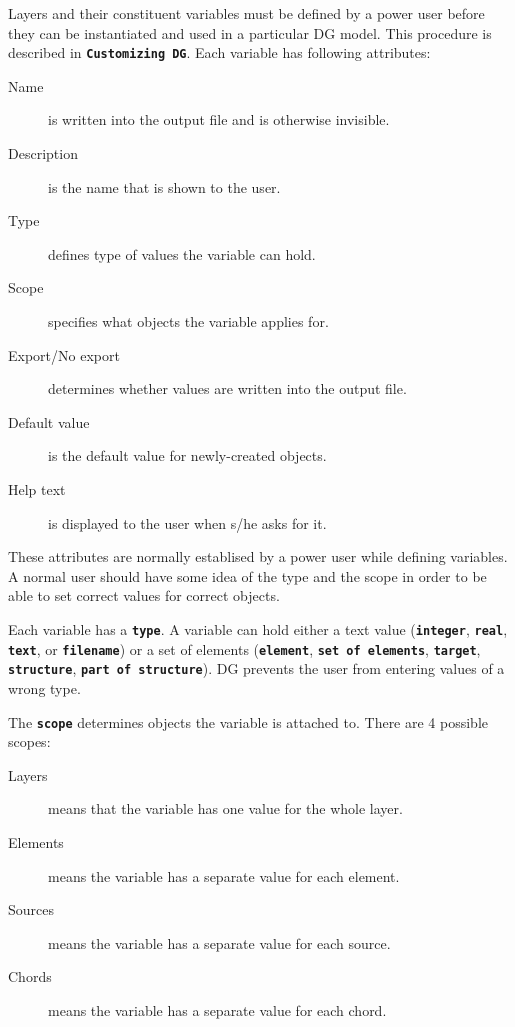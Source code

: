 \documentclass[12pt]{report}
\begin{document}
Layers and their constituent variables must be defined  
by a power user before they can be instantiated and used
in a particular DG model. This
procedure is described in \textbf{\texttt{Customizing DG}}. Each
variable has following attributes:

\begin{description}
  \item[Name] is written into the output file and is
otherwise invisible.
  \item[Description] is the name that is shown to the user.
  \item[Type] defines type of values the variable can hold.
  \item[Scope] specifies what objects the variable applies
for.
  \item[Export/No export] determines whether values are
written into the output file.
  \item[Default value] is the default value for newly-created
objects.
  \item[Help text] is displayed to the user when s/he asks
for it.
\end{description}

These attributes are normally establised by a power user while defining
variables. A normal user should have some idea of the type and the scope
in order to be able to set correct values for correct objects.

Each variable has a \textbf{\texttt{type}}. A variable can hold either
a text value (\textbf{\texttt{integer}}, \textbf{\texttt{real}}, 
\textbf{\texttt{text}}, or \textbf{\texttt{filename}}) or a set of elements
(\textbf{\texttt{element}}, \textbf{\texttt{set of elements}},
\textbf{\texttt{target}}, \textbf{\texttt{structure}},
\textbf{\texttt{part of structure}}). DG prevents the user from
entering values of a wrong type.

The \textbf{\texttt{scope}} determines objects the variable is
attached to. There are 4 possible scopes:

\begin{description}
\item[Layers] means that the variable has one value for the
whole layer.
\item[Elements] means the variable has a separate value for
each element.
\item[Sources] means the variable has a separate value for
each source.
\item[Chords] means the variable has a separate value for
each chord.
\end{description}
\end{document}
